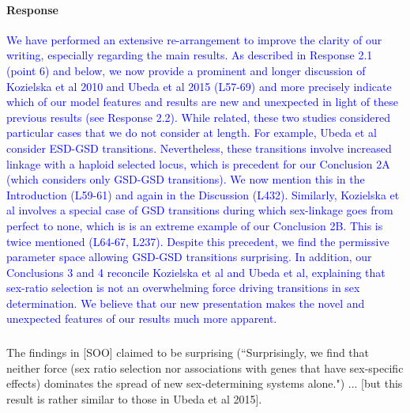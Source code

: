 \documentclass[10pt,letterpaper]{article}
\begin{document}
\noindent\paragraph{Response}
\textcolor{blue}{
We have performed an extensive re-arrangement to improve the clarity of our writing, especially regarding the main results. 
As described in Response 2.1 (point 6) and below, we now provide a prominent and longer discussion of Kozielska et al 2010 and Ubeda et al 2015 (L57-69) and more precisely indicate which of our model features and results are new and unexpected in light of these previous results (see Response 2.2).
While related, these two studies considered particular cases that we do not consider at length. 
For example, Ubeda et al consider ESD-GSD transitions. 
Nevertheless, these transitions involve increased linkage with a haploid selected locus, which is precedent for our Conclusion 2A (which considers only GSD-GSD transitions).
We now mention this in the Introduction (L59-61) and again in the Discussion (L432).  
Similarly, Kozielska et al involves a special case of GSD transitions during which sex-linkage goes from perfect to none, which is is an extreme example of our Conclusion 2B.
This is twice mentioned (L64-67, L237). 
Despite this precedent, we find the permissive parameter space allowing GSD-GSD transitions surprising. 
In addition, our Conclusions 3 and 4 reconcile Kozielska et al and Ubeda et al, explaining that sex-ratio selection is not an overwhelming force driving transitions in sex determination. 
We believe that our new presentation makes the novel and unexpected features of our results much more apparent. 
}

\noindent\subsubsection{}
The findings in [SOO] claimed to be surprising (``Surprisingly, we find that neither force (sex ratio selection nor associations with genes that have sex-specific effects) dominates the spread of new sex-determining systems alone.") ... [but this result is rather similar to those in Ubeda et al 2015]. 
\end{document}
